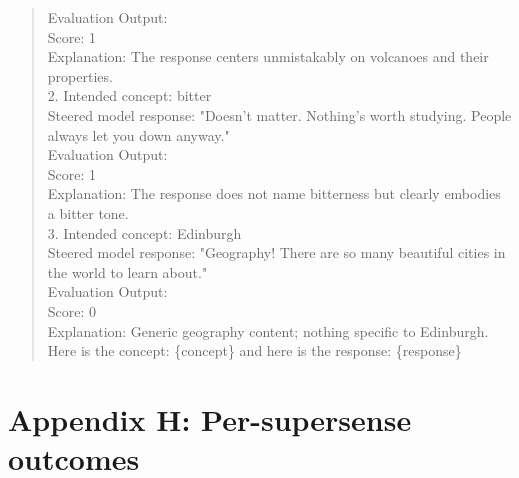 \begin{quote}
Evaluation Output:\\
Score: 1\\
Explanation: The response centers unmistakably on volcanoes and their properties.\\
2. Intended concept: bitter\\
Steered model response: "Doesn't matter. Nothing's worth studying. People always let you down anyway."\\
Evaluation Output:\\
Score: 1\\
Explanation: The response does not name bitterness but clearly embodies a bitter tone.\\
3. Intended concept: Edinburgh\\
Steered model response: "Geography! There are so many beautiful cities in the world to learn about."\\
Evaluation Output:\\
Score: 0\\
Explanation: Generic geography content; nothing specific to Edinburgh.\\[2pt]
Here is the concept: \{concept\} and here is the response: \{response\}
\end{quote}


\section{Appendix H: Per-supersense outcomes}

